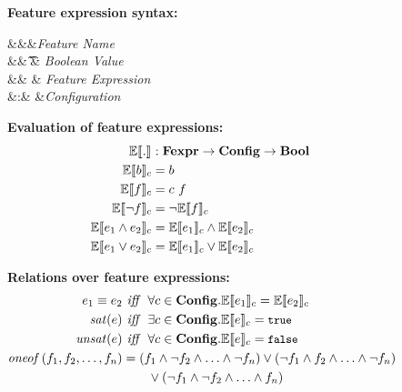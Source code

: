 \begin{figure}
%
\textbf{Feature expression syntax:}
\begin{syntax}
\synDef \fName \fSet &&&\textit{Feature Name}\\
\synDef \bTag \bSet &\eqq& \t \myOR \f & \textit{Boolean Value}\\
\synDef \dimMeta \ffSet &\eqq& \bTag \myOR \fName \myOR \neg \dimMeta \myOR \dimMeta \wedge \dimMeta \myOR \dimMeta \vee \dimMeta & \textit{Feature Expression}\\
\synDef \config \confSet &:& \fSet \to \bSet &\textit{Configuration}
\end{syntax}

\medskip
\textbf{Evaluation of feature expressions:}
\begin{alignat*}{1}
\fSem [] . &: \ffSet \to \confSet \to \bSet\\
\fSem \bTag &= \bTag\\
\fSem \fName &= \config \ \fName\\
\fSem {\neg \fName} &= \neg \fSem \fName\\
\fSem {\annd \dimMeta} &= \fSem {\dimMeta_1} \wedge \fSem {\dimMeta_2}\\
\fSem {\orr \dimMeta} &= \fSem {\dimMeta_1} \vee \fSem {\dimMeta_2}\\
\end{alignat*}

\medskip
\textbf{Relations over feature expressions:}
\begin{alignat*}{1}
\dimMeta_1 \equiv \dimMeta_2 &\textit{ iff \ } \forall \config \in \confSet. \fSem {\dimMeta_1} = \fSem {\dimMeta_2}\\
\sat {\dimMeta} &\textit{ iff \ } \exists \config \in \confSet. \fSem {\dimMeta} = \t\\
\unsat {\dimMeta} &\textit{ iff \ } \forall \config \in \confSet. \fSem {\dimMeta} = \f\\
\oneof {\A, \B, \ldots, \fName_n}
&= (\A \wedge \neg \B \wedge \ldots \wedge \neg \fName_n)
\vee (\neg \A \wedge \B \wedge \ldots \wedge \neg \fName_n)\\
&\qquad\vee (\neg \A \wedge \neg \B \wedge \ldots \wedge \fName_n)
\end{alignat*}


\end{figure}
